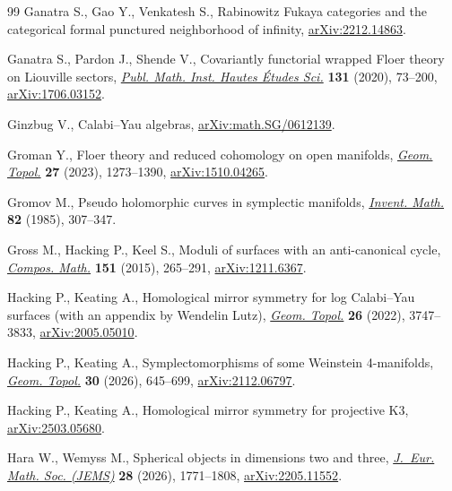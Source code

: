 \documentclass[10pt,a4paper]{amsart}
\theoremstyle{definition}
\numberwithin{equation}{section}
\begin{document}
\begin{thebibliography}{99}
Ganatra S., Gao Y., Venkatesh S., Rabinowitz {F}ukaya categories and the
 categorical formal punctured neighborhood of infinity,
 \href{http://arxiv.org/abs/2212.14863}{arXiv:2212.14863}.

Ganatra S., Pardon J., Shende V., Covariantly functorial wrapped {F}loer theory
 on {L}iouville sectors,
 \href{https://doi.org/10.1007/s10240-019-00112-x}{\textit{Publ. Math. Inst.
 Hautes \'{E}tudes Sci.}} \textbf{131} (2020), 73--200,
 \href{http://arxiv.org/abs/1706.03152}{arXiv:1706.03152}.

Ginzbug V., Calabi--{Y}au algebras,
 \href{http://arxiv.org/abs/math.SG/0612139}{arXiv:math.SG/0612139}.

Groman Y., Floer theory and reduced cohomology on open manifolds,
 \href{https://doi.org/10.2140/gt.2023.27.1273}{\textit{Geom. Topol.}}
 \textbf{27} (2023), 1273--1390,
 \href{http://arxiv.org/abs/1510.04265}{arXiv:1510.04265}.

Gromov M., Pseudo holomorphic curves in symplectic manifolds,
 \href{https://doi.org/10.1007/BF01388806}{\textit{Invent. Math.}} \textbf{82}
 (1985), 307--347.

Gross M., Hacking P., Keel S., Moduli of surfaces with an anti-canonical cycle,
 \href{https://doi.org/10.1112/S0010437X14007611}{\textit{Compos. Math.}}
 \textbf{151} (2015), 265--291,
 \href{http://arxiv.org/abs/1211.6367}{arXiv:1211.6367}.

Hacking P., Keating A., Homological mirror symmetry for log {C}alabi--{Y}au
 surfaces (with an appendix by {W}endelin {L}utz),
 \href{https://doi.org/10.2140/gt.2022.26.3747}{\textit{Geom. Topol.}}
 \textbf{26} (2022), 3747--3833,
 \href{http://arxiv.org/abs/2005.05010}{arXiv:2005.05010}.

Hacking P., Keating A., Symplectomorphisms of some {W}einstein 4-manifolds,
 \href{https://doi.org/10.2140/gt.2026.30.645}{\textit{Geom. Topol.}}
 \textbf{30} (2026), 645--699,
 \href{http://arxiv.org/abs/2112.06797}{arXiv:2112.06797}.

Hacking P., Keating A., Homological mirror symmetry for projective {K}3,
 \href{http://arxiv.org/abs/2503.05680}{arXiv:2503.05680}.

Hara W., Wemyss M., Spherical objects in dimensions two and three,
 \href{https://doi.org/10.4171/jems/1504}{\textit{J.~Eur. Math. Soc. (JEMS)}}
 \textbf{28} (2026), 1771--1808,
 \href{http://arxiv.org/abs/2205.11552}{arXiv:2205.11552}.


\end{thebibliography}
\end{document}
